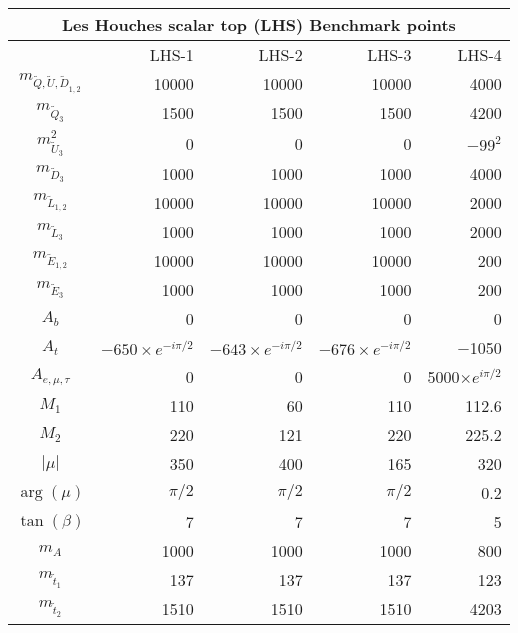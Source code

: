 \begin{table}[htb]\begin{center}\begin{tabular}{crrrr}
\multicolumn{5}{c}{Les Houches scalar top (LHS) Benchmark points} \\ \midrule
                               &    LHS-1 &    LHS-2 &    LHS-3 &    LHS-4 \\ \midrule
$m_{{\tilde Q,\tilde U,\tilde D}_{1,2}}$ 
                               &   10000 &   10000 &   10000 &    4000 \\
          $m_{{\tilde Q}_3}  $ &    1500 &    1500 &    1500 &    4200 \\
          $m_{{\tilde U}_3}^2$ &       0 &       0 &       0 & $-99^2$ \\
          $m_{{\tilde D}_3}  $ &    1000 &    1000 &    1000 &    4000 \\
        $m_{{\tilde L}_{1,2}}$ &   10000 &   10000 &   10000 &    2000 \\
          $m_{{\tilde L}_3}  $ &    1000 &    1000 &    1000 &    2000 \\
        $m_{{\tilde E}_{1,2}}$ &   10000 &   10000 &   10000 &     200 \\
          $m_{{\tilde E}_3}  $ &    1000 &    1000 &    1000 &     200 \\
                         $A_b$ &       0 &       0 &       0 &       0 \\
                         $A_t$ &  $-650\times e^{-i \pi/2}$ &  $-643\times e^{-i \pi/2}$ &  $-676\times e^{-i \pi/2}$ & $-$1050 \\
              $A_{e,\mu,\tau}$ &       0 &       0 &       0 & 5000$\times e^{i \pi/2}$ \\
                         $M_1$ &     110 &      60 &     110 &   112.6 \\
                         $M_2$ &     220 &     121 &     220 &   225.2 \\
                       $|\mu|$ &     350 &     400 &     165 &     320 \\
                   $\arg(\mu)$ & $\pi/2$ & $\pi/2$ & $\pi/2$ &     0.2 \\
                 $\tan(\beta)$ &       7 &       7 &       7 &       5 \\
                         $m_A$ &    1000 &    1000 &    1000 &     800 \\ \midrule
            $m_{{\tilde t}_1}$ &     137 &     137 &     137 &     123 \\
            $m_{{\tilde t}_2}$ &    1510 &    1510 &    1510 &    4203 \\

\end{tabular}
\end{center}
\end{table}
